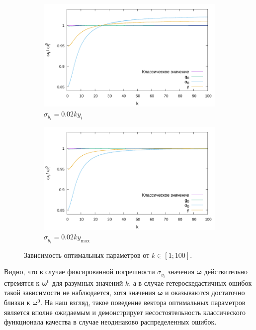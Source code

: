 \documentclass[tikz,10pt,a4paper]{article}
\newcommand{\bomega}{\boldsymbol{\omega}}
\begin{document}
\begin{figure}[h]
  \centering
  \begin{subfigure}[b]{0.5\textwidth}
    \includegraphics[width=\textwidth]{figs/levmar/convergence/convergence_1_100_0.01_yi.txt.pdf}
	\caption{$\sigma_{y_i} = 0.02ky_i$}
	\label{fig:conv_varY_100}
  \end{subfigure}%
  \begin{subfigure}[b]{0.5\textwidth}
    \includegraphics[width=\textwidth]{figs/levmar/convergence/convergence_1_100_0.01_ymax.txt.pdf}
	\caption{$\sigma_{y_i} = 0.02ky_{\max}$}
	\label{fig:conv_fixedY_100}
  \end{subfigure}
  \caption{Зависимость оптимальных параметров от $k \in [1; 100]$.}
  \label{fig:conv_varY}
\end{figure}

Видно, что в случае фиксированной погрешности $\sigma_{y_i}$ значения $\bomega$
действительно стремятся к $\bomega^0$ для разумных значений $k$, а в случае
гетероскедастичных ошибок такой зависимости не наблюдается, хотя значения $\bomega$
и оказываются достаточно близки к $\bomega^0$. На наш взгляд, такое поведение
вектора оптимальных параметров является вполне ожидаемым и демонстрирует
несостоятельность классического функционала качества в случае неодинаково
распределенных ошибок.
\end{document}
